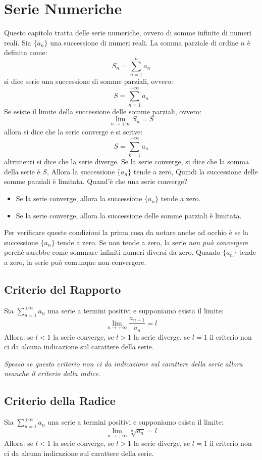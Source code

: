 \section{Serie Numeriche}
    Questo capitolo tratta delle serie numeriche, ovvero di somme infinite di numeri reali.
    Sia $\{a_n\}$ una successione di numeri reali. La somma parziale di ordine $n$ è definita come:
    \[
    S_n = \sum_{n=1}^n a_n
    \] si dice serie una successione di somme parziali, ovvero:
    \[ S = \sum_{n=1}^{+\infty} a_n \]
    Se esiste il limite della successione delle somme parziali, ovvero: \[ \lim_{n \to +\infty} S_n = S \] allora si dice che la serie converge e si scrive: \[ S = \sum_{k=1}^{+\infty} a_n \] altrimenti si dice che la serie diverge.
    Se la serie converge, si dice che la somma della serie è $S$, 
    Allora la successione $\{a_n\}$ tende a zero,
    Quindi la successione delle somme parziali è limitata.
    Quand'è che una serie converge?
    \begin{itemize}
        \item Se la serie converge, allora la successione $\{a_n\}$ tende a zero.
        \item Se la serie converge, allora la successione delle somme parziali è limitata.
    \end{itemize}
    Per verificare queste condizioni la prima cosa da notare anche ad occhio è se la successione $\{a_n\}$ tende a zero. Se non tende a zero, la serie \emph{non può convergere} perchè sarebbe come sommare infiniti numeri diversi da zero.
    Quando $\{a_n\}$ tende a zero, la serie può comunque non convergere.
    \subsection{Criterio del Rapporto}
          \begin{definizione}
             Sia \emph{$\sum_{n=1}^{+\infty}a_n$} una serie a termini positivi e supponiamo esista il limite:
                \[ \lim_{n \to +\infty} \frac{a_{n+1}}{a_n} = l \]
                Allora: se $l < 1$ la serie converge, se $l > 1$ la serie diverge, se $l = 1$ il criterio non ci da alcuna indicazione sul carattere della serie.
          \end{definizione}
                \emph{Spesso se questo criterio non ci da indicazione sul carattere della serie allora neanche il criterio della radice}.

    \subsection{Criterio della Radice}
    \begin{definizione}
        Sia \emph{$\sum_{n=1}^{+\infty}a_n$} una serie a termini positivi e supponiamo esista il limite:
        \[ \lim_{n \to +\infty} \sqrt[n]{a_n} = l \]
        Allora: se $l < 1$ la serie converge, se $l > 1$ la serie diverge, se $l = 1$ il criterio non ci da alcuna indicazione sul carattere della serie.
    \end{definizione} 
    
